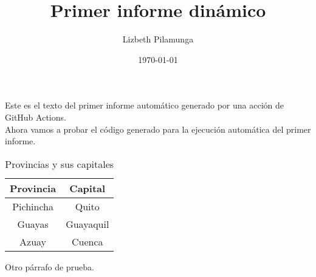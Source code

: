 \documentclass[12pt, a4paper]{book}
\title{Primer informe dinámico}
\author{Lizbeth Pilamunga}
\date{\today}
\begin{document}
\maketitle

Este es el texto del primer informe automático generado por una acción de GitHub Actions.\\

Ahora vamos a probar el código generado para la ejecución automática del primer informe.

\begin{table}[H]
\centering
\begin{tabular}{|c|c|}\hline
\textbf{Provincia} & \textbf{Capital} \\ \hline
Pichincha & Quito \\ \hline
Guayas & Guayaquil \\ \hline
Azuay & Cuenca \\ \hline
\end{tabular}
\caption{Provincias y sus capitales}
\end{table}

Otro párrafo de prueba.
\end{document}
